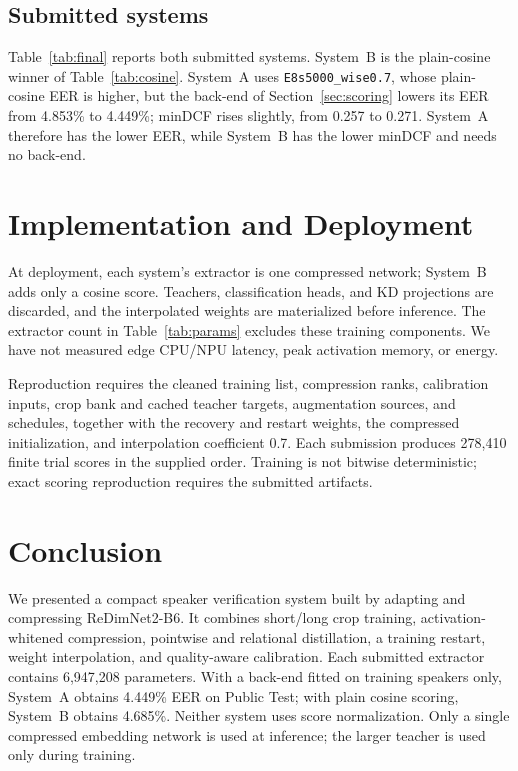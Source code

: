 \documentclass[11pt]{article}
\begin{document}
\subsection{Submitted systems}
Table~\ref{tab:final} reports both submitted systems. System~B is the plain-cosine winner of Table~\ref{tab:cosine}. System~A uses \nolinkurl{E8s5000_wise0.7}, whose plain-cosine EER is higher, but the back-end of Section~\ref{sec:scoring} lowers its EER from 4.853\% to 4.449\%; minDCF rises slightly, from 0.257 to 0.271. System~A therefore has the lower EER, while System~B has the lower minDCF and needs no back-end.

\section{Implementation and Deployment}
At deployment, each system's extractor is one compressed network; System~B adds only a cosine score. Teachers, classification heads, and KD projections are discarded, and the interpolated weights are materialized before inference. The extractor count in Table~\ref{tab:params} excludes these training components. We have not measured edge CPU/NPU latency, peak activation memory, or energy.

Reproduction requires the cleaned training list, compression ranks, calibration inputs, crop bank and cached teacher targets, augmentation sources, and schedules, together with the recovery and restart weights, the compressed initialization, and interpolation coefficient 0.7. Each submission produces 278,410 finite trial scores in the supplied order. Training is not bitwise deterministic; exact scoring reproduction requires the submitted artifacts.

\section{Conclusion}
We presented a compact speaker verification system built by adapting and compressing ReDimNet2-B6. It combines short/long crop training, activation-whitened compression, pointwise and relational distillation, a training restart, weight interpolation, and quality-aware calibration. Each submitted extractor contains 6,947,208 parameters. With a back-end fitted on training speakers only, System~A obtains 4.449\% EER on Public Test; with plain cosine scoring, System~B obtains 4.685\%. Neither system uses score normalization. Only a single compressed embedding network is used at inference; the larger teacher is used only during training.



\end{document}
